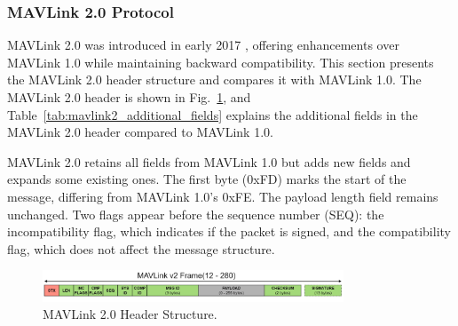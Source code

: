 \subsubsection{MAVLink 2.0 Protocol}

MAVLink 2.0 was introduced in early 2017 \cite{allouch2019mavsec, khan2020emerging}, offering enhancements over MAVLink 1.0 while maintaining backward compatibility. This section presents the MAVLink 2.0 header structure and compares it with MAVLink 1.0. The MAVLink 2.0 header is shown in Fig.~\ref{fig:mavlink-v2-packet}, and Table~\ref{tab:mavlink2_additional_fields} explains the additional fields in the MAVLink 2.0 header compared to MAVLink 1.0.

\vspace{0.5cm}

MAVLink 2.0 retains all fields from MAVLink 1.0 but adds new fields and expands some existing ones. The first byte (0xFD) marks the start of the message, differing from MAVLink 1.0's 0xFE. The payload length field remains unchanged. Two flags appear before the sequence number (SEQ): the incompatibility flag, which indicates if the packet is signed, and the compatibility flag, which does not affect the message structure.

\begin{figure}[ht]
\centering
\includegraphics[width=0.8\textwidth]{Figures/Chapter1/Section4/2.jpg}
\caption{MAVLink 2.0 Header Structure.}
\label{fig:mavlink-v2-packet}
\end{figure}


